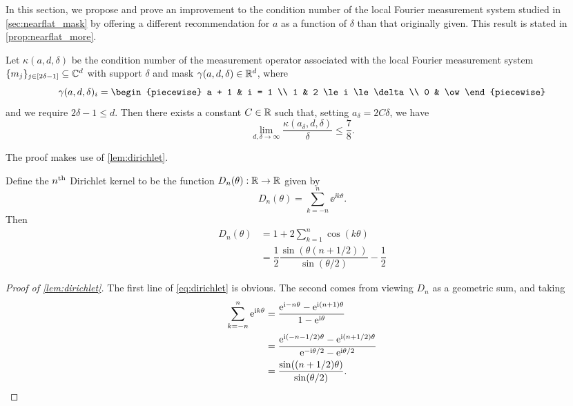 In this section, we propose and prove an improvement to the condition number of the local Fourier measurement system studied in \cref{sec:nearflat_mask} by offering a different recommendation for $a$ as a function of $\delta$ than that originally given.  This result is stated in \cref{prop:nearflat_more}.

\begin{proposition} \label{prop:nearflat_more}
  Let $\kappa(a, d, \delta)$ be the condition number of the measurement operator associated with the local Fourier measurement system $\{m_j\}_{j \in [2 \delta - 1]} \subseteq \mathbb{C}^d$ with support $\delta$ and mask $\gamma(a, d, \delta) \in \mathbb{R}^d$, where \[\gamma(a, d, \delta)_i = \begin{piecewise} a + 1 & i = 1 \\ 1 & 2 \le i \le \delta \\ 0 & \ow \end{piecewise}\] and we require $2 \delta - 1 \le d$.  Then there exists a constant $C \in \mathbb{R}$ such that, setting $a_\delta = 2 C \delta$, we have \[\lim_{d, \delta \to \infty} \dfrac{\kappa(a_\delta, d, \delta)}{\delta} \le \frac{7}{8}.\]
\end{proposition}

The proof makes use of \cref{lem:dirichlet}.

\begin{lemma} \label{lem:dirichlet}
  Define the $n^{\text{th}}$ Dirichlet kernel to be the function $D_n(\theta) : \mathbb{R} \to \mathbb{R}$ given by \[D_n(\theta) = \sum_{k = -n}^n \ee^{\ii k \theta}.\]  Then 
  \begin{equation}
    \begin{aligned}
      D_n(\theta) &= 1 + 2 \sum_{k = 1}^n \cos(k \theta) \\
      &= \dfrac{1}{2} \dfrac{\sin(\theta (n + 1/2))}{\sin(\theta / 2)} - \dfrac{1}{2}
    \end{aligned}
    \label{eq:dirichlet}
  \end{equation}
\end{lemma}

\begin{proof}[Proof of \cref{lem:dirichlet}]
  The first line of \eqref{eq:dirichlet} is obvious.  The second comes from viewing $D_n$ as a geometric sum, and taking
  \begin{align*}
    \sum_{k = -n}^n \mathrm{e}^{\mathrm{i} k \theta} &= \dfrac{\mathrm{e}^{\mathrm{i} -n \theta} - \mathrm{e}^{\mathrm{i} (n + 1)\theta}}{1 - \mathrm{e}^{\mathrm{i} \theta}} \\
    &= \dfrac{\mathrm{e}^{\mathrm{i} (-n - 1/2) \theta} - \mathrm{e}^{\mathrm{i} (n + 1/2) \theta}}{\mathrm{e}^{-\mathrm{i} \theta / 2} - \mathrm{e}^{\mathrm{i} \theta / 2}} \\
    &= \dfrac{\sin((n + 1/2) \theta)}{\sin(\theta / 2)}.
  \end{align*}
\end{proof}

